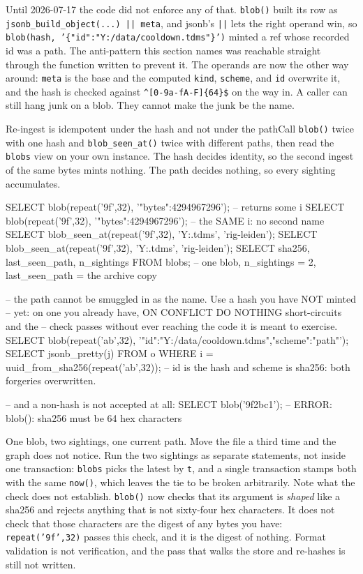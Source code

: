 Until 2026-07-17 the code did not enforce any of that. \texttt{blob()} built its row as \texttt{jsonb\_build\_object(...) || meta}, and jsonb's \texttt{||} lets the right operand win, so \texttt{blob(hash, '\{"id":"Y:/data/cooldown.tdms"\}')} minted a ref whose recorded id was a path. The anti-pattern this section names was reachable straight through the function written to prevent it. The operands are now the other way around: \texttt{meta} is the base and the computed \texttt{kind}, \texttt{scheme}, and \texttt{id} overwrite it, and the hash is checked against \texttt{\^{}[0-9a-fA-F]\{64\}\$} on the way in. A caller can still hang junk on a blob. They cannot make the junk be the name.

\begin{Correspondence}{Re-ingest is idempotent under the hash and not under the path}{Call \texttt{blob()} twice with one hash and \texttt{blob\_seen\_at()} twice with different paths, then read the \texttt{blobs} view on your own instance.}
The hash decides identity, so the second ingest of the same bytes mints nothing. The path decides nothing, so every sighting accumulates.
\begin{Check}
SELECT blob(repeat('9f',32), '{"bytes":4294967296}');   -- returns some i
SELECT blob(repeat('9f',32), '{"bytes":4294967296}');   -- the SAME i: no second name
SELECT blob_seen_at(repeat('9f',32), 'Y:\data\raw\cooldown.tdms', 'rig-leiden');
SELECT blob_seen_at(repeat('9f',32), 'Y:\archive{}\cooldown.tdms', 'rig-leiden');
SELECT sha256, last_seen_path, n_sightings FROM blobs;
-- one blob, n_sightings = 2, last_seen_path = the archive copy

-- the path cannot be smuggled in as the name. Use a hash you have NOT minted
-- yet: on one you already have, ON CONFLICT DO NOTHING short-circuits and the
-- check passes without ever reaching the code it is meant to exercise.
SELECT blob(repeat('ab',32), '{"id":"Y:/data/cooldown.tdms","scheme":"path"}');
SELECT jsonb_pretty(j) FROM o WHERE i = uuid_from_sha256(repeat('ab',32));
-- id is the hash and scheme is sha256: both forgeries overwritten.

-- and a non-hash is not accepted at all:
SELECT blob('9f2bc1');   -- ERROR: blob(): sha256 must be 64 hex characters
\end{Check}
One blob, two sightings, one current path. Move the file a third time and the graph does not notice. Run the two sightings as separate statements, not inside one transaction: \texttt{blobs} picks the latest by \texttt{t}, and a single transaction stamps both with the same \texttt{now()}, which leaves the tie to be broken arbitrarily. Note what the check does not establish. \texttt{blob()} now checks that its argument is \emph{shaped} like a sha256 and rejects anything that is not sixty-four hex characters. It does not check that those characters are the digest of any bytes you have: \texttt{repeat('9f',32)} passes this check, and it is the digest of nothing. Format validation is not verification, and the pass that walks the store and re-hashes is still not written.
\end{Correspondence}

